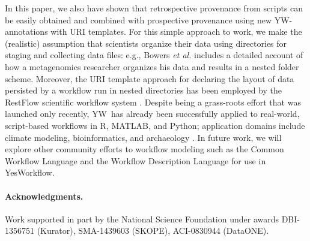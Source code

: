 \documentclass[nocopyrightspace]{sigplanconf}
\newcommand{\YW}{\textsf{YesWorkflow}}
\newcommand{\yw}{\textsf{YW}}
\newcommand{\R}{\textsf{R}}
\newcommand{\MATLAB}{\textsf{MATLAB}}
\begin{document}
In this paper, we also have shown that retrospective provenance from
scripts can be easily obtained and combined with prospective
provenance using new \yw-annotations with URI templates. For this
simple approach to work, we make the (realistic) assumption that
scientists organize their data using directories for staging and
collecting data files: e.g., Bowers \emph{et al.}
\cite{bowers2007project} includes a detailed account of how a
metagenomics researcher organizes his data and results in a nested
folder scheme. Moreover, the URI template approach for declaring the
layout of data persisted by a workflow run in nested directories has
been employed by the RestFlow scientific workflow system
\cite{tsai2013autodrug}.
Despite being a grass-roots effort that was launched only recently,
\yw\ has already been successfully applied to real-world, script-based
workflows in \R, \MATLAB, and Python; application domains include
climate modeling, bioinformatics, and archaeology
\cite{mcphillips2015ywIJDC}.
In future work, we will explore other community efforts to workflow
modeling such as the Common Workflow Language \cite{amstutz15CDL} and
the Workflow Description Language \cite{frazer15WDL} for use in \YW.

\paragraph{Acknowledgments.}
Work supported in part by the National Science Foundation under awards
DBI-1356751 (Kurator), SMA-1439603 (SKOPE), ACI-0830944 (DataONE).




\end{document}
